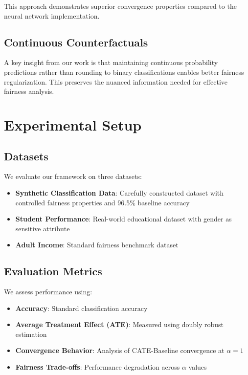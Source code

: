 \documentclass{article} %
\begin{document}
This approach demonstrates superior convergence properties compared to the neural network implementation.

\subsection{Continuous Counterfactuals}

A key insight from our work is that maintaining continuous probability predictions rather than rounding to binary classifications enables better fairness regularization. This preserves the nuanced information needed for effective fairness analysis.

\section{Experimental Setup}

\subsection{Datasets}

We evaluate our framework on three datasets:

\begin{itemize}
\item \textbf{Synthetic Classification Data}: Carefully constructed dataset with controlled fairness properties and 96.5\% baseline accuracy
\item \textbf{Student Performance}: Real-world educational dataset with gender as sensitive attribute
\item \textbf{Adult Income}: Standard fairness benchmark dataset
\end{itemize}

\subsection{Evaluation Metrics}

We assess performance using:
\begin{itemize}
\item \textbf{Accuracy}: Standard classification accuracy
\item \textbf{Average Treatment Effect (ATE)}: Measured using doubly robust estimation
\item \textbf{Convergence Behavior}: Analysis of CATE-Baseline convergence at $\alpha = 1$
\item \textbf{Fairness Trade-offs}: Performance degradation across $\alpha$ values
\end{itemize}
\end{document}
